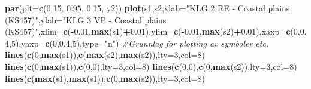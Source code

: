 \documentclass[]{article}
\newenvironment{Shaded}{\begin{snugshade}}{\end{snugshade}}
\newcommand{\CommentTok}[1]{\textcolor[rgb]{0.56,0.35,0.01}{\textit{#1}}}
\newcommand{\DataTypeTok}[1]{\textcolor[rgb]{0.13,0.29,0.53}{#1}}
\newcommand{\DecValTok}[1]{\textcolor[rgb]{0.00,0.00,0.81}{#1}}
\newcommand{\FloatTok}[1]{\textcolor[rgb]{0.00,0.00,0.81}{#1}}
\newcommand{\KeywordTok}[1]{\textcolor[rgb]{0.13,0.29,0.53}{\textbf{#1}}}
\newcommand{\NormalTok}[1]{#1}
\newcommand{\OperatorTok}[1]{\textcolor[rgb]{0.81,0.36,0.00}{\textbf{#1}}}
\newcommand{\StringTok}[1]{\textcolor[rgb]{0.31,0.60,0.02}{#1}}
\begin{document}
\begin{Shaded}
\begin{Highlighting}[]
\KeywordTok{par}\NormalTok{(}\DataTypeTok{plt=}\KeywordTok{c}\NormalTok{(}\FloatTok{0.15}\NormalTok{, }\FloatTok{0.95}\NormalTok{, }\FloatTok{0.15}\NormalTok{, y2))}
\KeywordTok{plot}\NormalTok{(s1,s2,}\DataTypeTok{xlab=}\StringTok{"KLG 2 RE - Coastal plains (KS457)"}\NormalTok{,}\DataTypeTok{ylab=}\StringTok{"KLG 3 VP - Coastal plains (KS457)"}\NormalTok{,}\DataTypeTok{xlim=}\KeywordTok{c}\NormalTok{(}\OperatorTok{-}\FloatTok{0.01}\NormalTok{,}\KeywordTok{max}\NormalTok{(s1)}\OperatorTok{+}\FloatTok{0.01}\NormalTok{),}\DataTypeTok{ylim=}\KeywordTok{c}\NormalTok{(}\OperatorTok{-}\FloatTok{0.01}\NormalTok{,}\KeywordTok{max}\NormalTok{(s2)}\OperatorTok{+}\FloatTok{0.01}\NormalTok{),}\DataTypeTok{xaxp=}\KeywordTok{c}\NormalTok{(}\DecValTok{0}\NormalTok{,}\FloatTok{0.4}\NormalTok{,}\DecValTok{5}\NormalTok{),}\DataTypeTok{yaxp=}\KeywordTok{c}\NormalTok{(}\DecValTok{0}\NormalTok{,}\FloatTok{0.4}\NormalTok{,}\DecValTok{5}\NormalTok{),}\DataTypeTok{type=}\StringTok{"n"}\NormalTok{) }\CommentTok{#Grunnlag for plotting av symboler etc.}
\KeywordTok{lines}\NormalTok{(}\KeywordTok{c}\NormalTok{(}\DecValTok{0}\NormalTok{,}\KeywordTok{max}\NormalTok{(s1)),}\KeywordTok{c}\NormalTok{(}\KeywordTok{max}\NormalTok{(s2),}\KeywordTok{max}\NormalTok{(s2)),}\DataTypeTok{lty=}\DecValTok{3}\NormalTok{,}\DataTypeTok{col=}\DecValTok{8}\NormalTok{)}
\KeywordTok{lines}\NormalTok{(}\KeywordTok{c}\NormalTok{(}\DecValTok{0}\NormalTok{,}\KeywordTok{max}\NormalTok{(s1)),}\KeywordTok{c}\NormalTok{(}\DecValTok{0}\NormalTok{,}\DecValTok{0}\NormalTok{),}\DataTypeTok{lty=}\DecValTok{3}\NormalTok{,}\DataTypeTok{col=}\DecValTok{8}\NormalTok{)}
\KeywordTok{lines}\NormalTok{(}\KeywordTok{c}\NormalTok{(}\DecValTok{0}\NormalTok{,}\DecValTok{0}\NormalTok{),}\KeywordTok{c}\NormalTok{(}\DecValTok{0}\NormalTok{,}\KeywordTok{max}\NormalTok{(s2)),}\DataTypeTok{lty=}\DecValTok{3}\NormalTok{,}\DataTypeTok{col=}\DecValTok{8}\NormalTok{)}
\KeywordTok{lines}\NormalTok{(}\KeywordTok{c}\NormalTok{(}\KeywordTok{max}\NormalTok{(s1),}\KeywordTok{max}\NormalTok{(s1)),}\KeywordTok{c}\NormalTok{(}\DecValTok{0}\NormalTok{,}\KeywordTok{max}\NormalTok{(s2)),}\DataTypeTok{lty=}\DecValTok{3}\NormalTok{,}\DataTypeTok{col=}\DecValTok{8}\NormalTok{)}


\end{Highlighting}
\end{Shaded}
\end{document}
